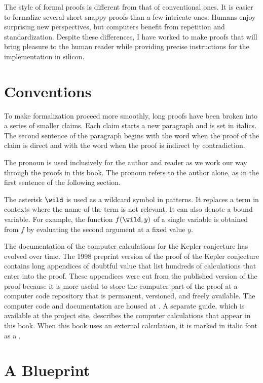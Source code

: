 The style of formal proofs is different from that of conventional
ones.  It is easier to formalize several short snappy proofs
than a few intricate ones.  Humans enjoy surprising new perspectives,
but computers benefit from repetition and standardization.  Despite
these differences, I have worked to make proofs that will bring
pleasure to the human reader while providing precise instructions for
the implementation in silicon.

\section*{Conventions}

To make formalization proceed more smoothly, long proofs have been
broken into a series of smaller claims.  Each claim starts a new paragraph
and is set in italics.  The second sentence of the paragraph begins with
the word  when the proof of the claim is direct and with
the word  when the proof is indirect by contradiction.

The pronoun  is used inclusively for the author and reader as
we work our way through the proofs in this book.  The pronoun  
refers to the author alone, as in the first sentence of the following section.

The asterisk $\wild$ is used as a wildcard symbol in patterns.  It
replaces a term in contexts where the name of the term is not
relevant.  It can also denote a bound variable.  For example, the
function $f(\wild,y)$ of a single variable is obtained from $f$ by
evaluating the second argument at a fixed value $y$.

The documentation of the computer calculations for the Kepler
conjecture has evolved over time.  The 1998 preprint version of the
proof of the Kepler conjecture contains long appendices of doubtful
value that list hundreds of calculations that enter into the proof.
These appendices were cut from the published version of the proof
because it is more useful to store the computer part of the proof at a
computer code repository that is permanent, versioned, and freely
available.  The computer code and documentation are housed at
.  A separate guide, which is
available at the project site, describes the computer calculations
that appear in this book.  When this book uses an external
calculation, it is marked in italic font as a .

\section*{A Blueprint}

